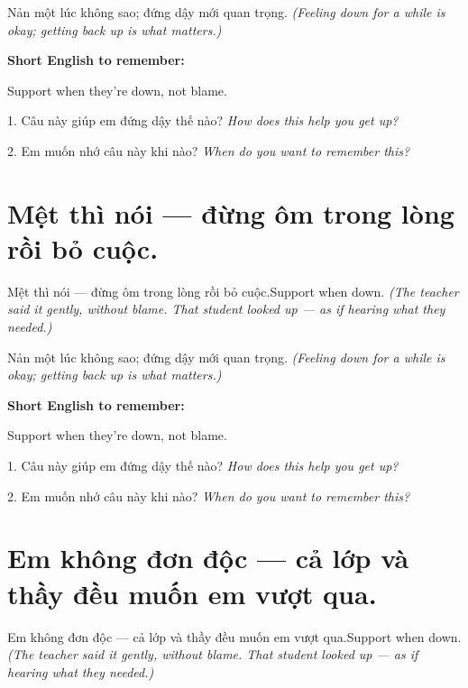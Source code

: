 \begin{baihoc}
Nản một lúc không sao; đứng dậy mới quan trọng.
\textit{(Feeling down for a while is okay; getting back up is what matters.)}
\end{baihoc}

\begin{ghinhoanh}
\textbf{Short English to remember:}

Support when they're down, not blame.

\end{ghinhoanh}

\begin{tuhocnhanh}
1. Câu này giúp em đứng dậy thế nào? \textit{How does this help you get up?}

2. Em muốn nhớ câu này khi nào? \textit{When do you want to remember this?}
\end{tuhocnhanh}
\ngancach


\section{Mệt thì nói — đừng ôm trong lòng rồi bỏ cuộc.}
\begin{truyen}{Mệt thì nói — đừng ôm trong lòng rồi bỏ cuộc.}{Support when down.}
\textit{(The teacher said it gently, without blame. That student looked up — as if hearing what they needed.)}
\end{truyen}

\begin{baihoc}
Nản một lúc không sao; đứng dậy mới quan trọng.
\textit{(Feeling down for a while is okay; getting back up is what matters.)}
\end{baihoc}

\begin{ghinhoanh}
\textbf{Short English to remember:}

Support when they're down, not blame.

\end{ghinhoanh}

\begin{tuhocnhanh}
1. Câu này giúp em đứng dậy thế nào? \textit{How does this help you get up?}

2. Em muốn nhớ câu này khi nào? \textit{When do you want to remember this?}
\end{tuhocnhanh}
\ngancach


\section{Em không đơn độc — cả lớp và thầy đều muốn em vượt qua.}
\begin{truyen}{Em không đơn độc — cả lớp và thầy đều muốn em vượt qua.}{Support when down.}
\textit{(The teacher said it gently, without blame. That student looked up — as if hearing what they needed.)}
\end{truyen}

